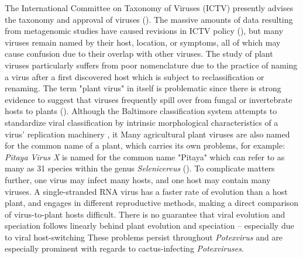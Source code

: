\documentclass[11pt,letterpaper,titlepage]{article}
\begin{document}
\begin{linenumbers}
The International Committee on Taxonomy of Viruses (ICTV) presently advises the taxonomy and approval of viruses (\cite{simmonds2017virus, lefkowitz2018virus,international2020new}).
The massive amounts of data resulting from metagenomic studies have caused revisions in ICTV policy (\cite{international2020new, simmonds2017virus}), but many viruses remain named by their host, location, or symptoms, all of which may cause confusion due to their overlap with other viruses.  
The study of plant viruses particularly suffers from poor nomenclature due to the practice of naming a virus after a first discovered host which is subject to reclassification or renaming. 
The term "plant virus" in itself is problematic since there is strong evidence to suggest that viruses frequently spill over from fungal or invertebrate hosts to plants (\cite{lefeuvre_evolution_2019}).
Although the Baltimore classification system attempts to standardize viral classification by intrinsic morphological characteristics of a virus' replication machinery \cite{international2020new}, it 
Many agricultural plant viruses are also named for the common name of a plant, which carries its own problems, for example: \textit{Pitaya Virus X} is named for the common name "Pitaya" which can refer to as many as 31 species within the genus \textit{Selenicereus} (\cite{korotkova_phylogenetic_2017, guerrero_phylogenetic_2019, le_bellec_12_2011}). 
To complicate matters further, one virus may infect many hosts, and one host may contain many viruses. 
A single-stranded RNA virus has a faster rate of evolution than a host plant, and engages in different reproductive methods, making a direct comparison of virus-to-plant hosts difficult.
There is no guarantee that viral evolution and speciation follows linearly behind plant evolution and speciation -- especially due to viral host-switching 
These problems persist throughout \textit{Potexvirus} and are especially prominent with regards to cactus-infecting \textit{Potexviruses}.




\end{linenumbers}
\end{document}
